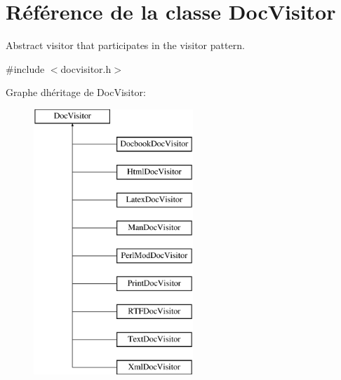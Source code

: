 \hypertarget{class_doc_visitor}{}\section{Référence de la classe Doc\+Visitor}
\label{class_doc_visitor}


Abstract visitor that participates in the visitor pattern.  




{\ttfamily \#include $<$docvisitor.\+h$>$}

Graphe d\textquotesingle{}héritage de Doc\+Visitor\+:\begin{figure}[H]
\begin{center}
\leavevmode
\includegraphics[height=10.000000cm]{class_doc_visitor}
\end{center}
\end{figure}
